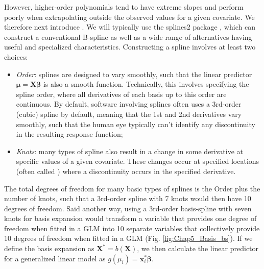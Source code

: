 However, higher-order polynomials tend to have extreme slopes and perform poorly when extrapolating outside the observed values for a given covariate.  We therefore next introduce .  We will typically use the \colorbox{backcolour}{splines2} package \cite{wang_shape-restricted_2021}, which can construct a conventional B-spline as well as a wide range of alternatives having useful and specialized characteristics.  Constructing a spline involves at least two choices:
\begin{itemize}
    \item \textit{Order}:  splines are designed to vary smoothly, such that the linear predictor \( \mathbf{\mu = X \beta} \) is also a smooth function.  Technically, this involves specifying the spline order, where all derivatives of each basis up to this order are continuous.  By default, software involving splines often uses a 3rd-order (cubic) spline by default, meaning that the 1st and 2nd derivatives vary smoothly, such that the human eye typically can't identify any discontinuity in the resulting response function;
    
    \item \textit{Knots}:  many types of spline also result in a change in some derivative at specific values of a given covariate.  These changes occur at specified locations (often called ) where a discontinuity occurs in the specified derivative. 
\end{itemize}
The total degrees of freedom for many basic types of splines is the Order plus the number of knots, such that a 3rd-order spline with 7 knots would then have 10 degrees of freedom.  Said another way, using a 3rd-order basis-spline with seven knots for basis expansion would transform a variable that provides one degree of freedom when fitted in a GLM into 10 separate variables that collectively provide 10 degrees of freedom when fitted in a GLM (Fig. \ref{fig:Chap5_Basis_bs}).  If we define the basis expansion as \(\mathbf{X}^*=b(\mathbf{X})\), we then calculate the linear predictor for a generalized linear model as \( g(\mu_i) = \mathbf{x}_i^* \mathbf{\beta} \).  

